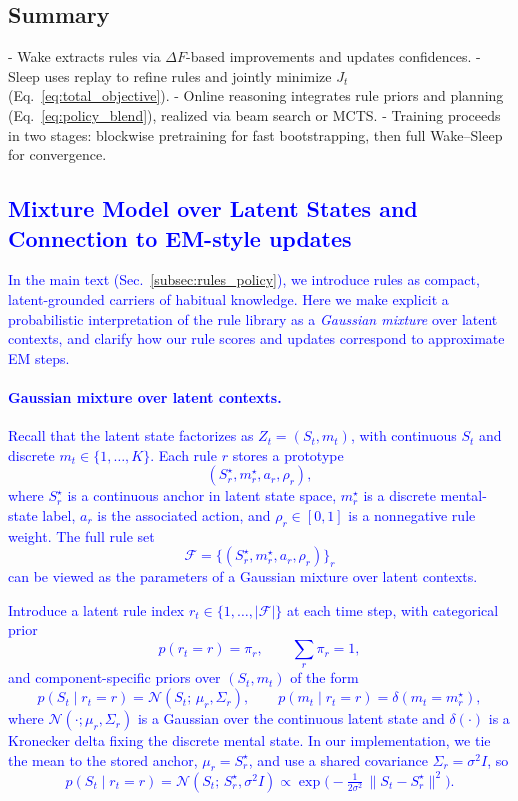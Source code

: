 \documentclass{article} %
\newcommand{\revise}[1]{\textcolor{blue}{#1}}
\begin{document}
\subsection{Summary}
- Wake extracts rules via $\Delta F$-based improvements and updates confidences.  
- Sleep uses replay to refine rules and jointly minimize $J_t$ (Eq.~\ref{eq:total_objective}).  
- Online reasoning integrates rule priors and planning (Eq.~\ref{eq:policy_blend}), realized via beam search or MCTS.  
- Training proceeds in two stages: blockwise pretraining for fast bootstrapping, then full Wake–Sleep for convergence.
\revise{\section{Mixture Model over Latent States and Connection to EM-style updates}
\label{app:rule-mixture}
In the main text (Sec.~\ref{subsec:rules_policy}), we introduce rules as compact, latent-grounded carriers of habitual knowledge. Here we make explicit a probabilistic interpretation of the rule library as a \emph{Gaussian mixture} over latent contexts, and clarify how our rule scores and updates correspond to approximate EM steps.}
\revise{\paragraph{Gaussian mixture over latent contexts.}
Recall that the latent state factorizes as $Z_t = (S_t, m_t)$, with continuous $S_t$ and discrete $m_t \in \{1,\dots,K\}$. Each rule $r$ stores a prototype
\[
(S_r^\star, m_r^\star, a_r, \rho_r),
\]
where $S_r^\star$ is a continuous anchor in latent state space, $m_r^\star$ is a discrete mental-state label, $a_r$ is the associated action, and $\rho_r \in [0,1]$ is a nonnegative rule weight. The full rule set
\[
\mathcal{F} = \{(S_r^\star, m_r^\star, a_r, \rho_r)\}_r
\]
can be viewed as the parameters of a Gaussian mixture over latent contexts.}

\revise{Introduce a latent rule index $r_t \in \{1,\dots,|\mathcal{F}|\}$ at each time step, with categorical prior
\[
p(r_t = r) = \pi_r, \qquad \sum_r \pi_r = 1,
\]
and component-specific priors over $(S_t, m_t)$ of the form
\[
p(S_t \mid r_t = r) = \mathcal N(S_t;\,\mu_r,\Sigma_r),\qquad
p(m_t \mid r_t = r) = \delta(m_t = m_r^\star),
\]
where $\mathcal N(\cdot;\mu_r,\Sigma_r)$ is a Gaussian over the continuous latent state and $\delta(\cdot)$ is a Kronecker delta fixing the discrete mental state. In our implementation, we tie the mean to the stored anchor, $\mu_r = S_r^\star$, and use a shared covariance $\Sigma_r = \sigma^2 I$, so
\[
p(S_t \mid r_t = r)
= \mathcal N(S_t;\,S_r^\star,\sigma^2 I)
\propto \exp\!\big(-\tfrac{1}{2\sigma^2}\,\|S_t - S_r^\star\|^2\big).
\]}
\end{document}
